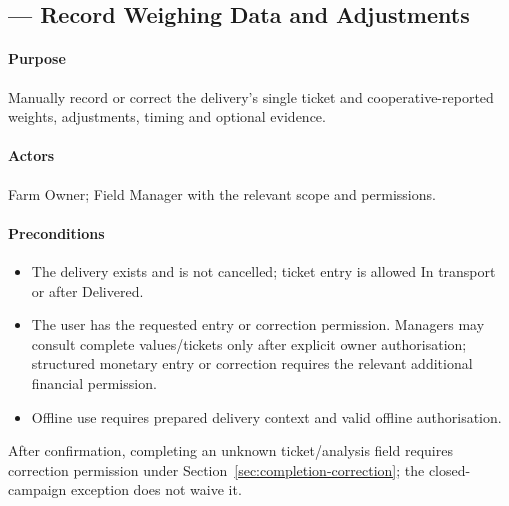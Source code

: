 \subsection{ --- Record Weighing Data and Adjustments}\label{uc:16}

\paragraph{Purpose}
Manually record or correct the delivery's single ticket and cooperative-reported weights, adjustments, timing and optional evidence.

\paragraph{Actors}
Farm Owner; Field Manager with the relevant scope and permissions.

\paragraph{Preconditions}
\begin{itemize}
\item The delivery exists and is not cancelled; ticket entry is allowed In transport or after Delivered.
\item The user has the requested entry or correction permission. Managers may consult complete values/tickets only after explicit owner authorisation; structured monetary entry or correction requires the relevant additional financial permission.
\item Offline use requires prepared delivery context and valid offline authorisation.
\end{itemize}

After confirmation, completing an unknown ticket/analysis field requires correction permission under Section~\ref{sec:completion-correction}; the closed-campaign exception does not waive it.

